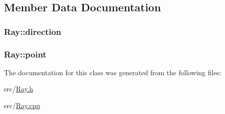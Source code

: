 \subsection{Member Data Documentation}
\subsubsection[{\texorpdfstring{direction}{direction}}]{ Ray\+::direction\hspace{0.3cm}{\ttfamily [private]}}\hypertarget{classRay_afe8cae110601e8ece9edd45ba500c2d0}{}\label{classRay_afe8cae110601e8ece9edd45ba500c2d0}
\subsubsection[{\texorpdfstring{point}{point}}]{ Ray\+::point\hspace{0.3cm}{\ttfamily [private]}}\hypertarget{classRay_a35cd5ddd116f79b927e5ce1dfaca64c7}{}\label{classRay_a35cd5ddd116f79b927e5ce1dfaca64c7}


The documentation for this class was generated from the following files\+:\begin{DoxyCompactItemize}
\item 
src/\hyperlink{Ray_8h}{Ray.\+h}\item 
src/\hyperlink{Ray_8cpp}{Ray.\+cpp}\end{DoxyCompactItemize}

